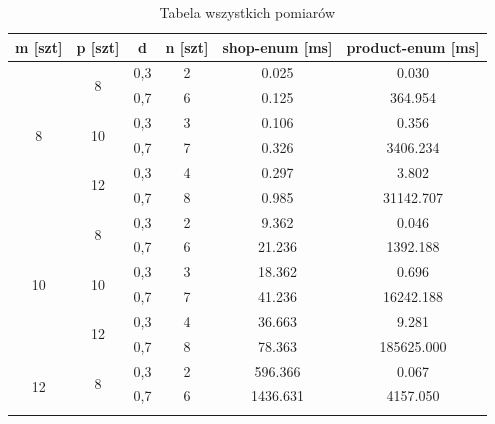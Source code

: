 \documentclass[a4paper]{article}
\begin{document}
\begin{table}[H]
\centering
\caption{Tabela wszystkich pomiarów}
\renewcommand{\arraystretch}{1.3}
\begin{tabular}{|c|c|c|c|c|c|}
\hline
m {[}szt{]}         & p {[}szt{]}         & d   & n {[}szt{]} & shop-enum {[}ms{]} & product-enum {[}ms{]} \\ \hline
\multirow{6}{*}{8}  & \multirow{2}{*}{8}  & 0,3 & 2           & 0.025              & 0.030                 \\ \cline{3-6} 
                    &                     & 0,7 & 6           & 0.125              & 364.954               \\ \cline{2-6} 
                    & \multirow{2}{*}{10} & 0,3 & 3           & 0.106              & 0.356                 \\ \cline{3-6} 
                    &                     & 0,7 & 7           & 0.326              & 3406.234              \\ \cline{2-6} 
                    & \multirow{2}{*}{12} & 0,3 & 4           & 0.297              & 3.802                 \\ \cline{3-6} 
                    &                     & 0,7 & 8           & 0.985              & 31142.707             \\ \hline
\multirow{6}{*}{10} & \multirow{2}{*}{8}  & 0,3 & 2           & 9.362              & 0.046                 \\ \cline{3-6} 
                    &                     & 0,7 & 6           & 21.236             & 1392.188              \\ \cline{2-6} 
                    & \multirow{2}{*}{10} & 0,3 & 3           & 18.362             & 0.696                 \\ \cline{3-6} 
                    &                     & 0,7 & 7           & 41.236             & 16242.188             \\ \cline{2-6} 
                    & \multirow{2}{*}{12} & 0,3 & 4           & 36.663             & 9.281                 \\ \cline{3-6} 
                    &                     & 0,7 & 8           & 78.363             & 185625.000            \\ \hline
\multirow{6}{*}{12} & \multirow{2}{*}{8}  & 0,3 & 2           & 596.366            & 0.067                 \\ \cline{3-6} 
                    &                     & 0,7 & 6           & 1436.631           & 4157.050              \\ \cline{2-6} 

\end{tabular}
\end{table}
\end{document}
